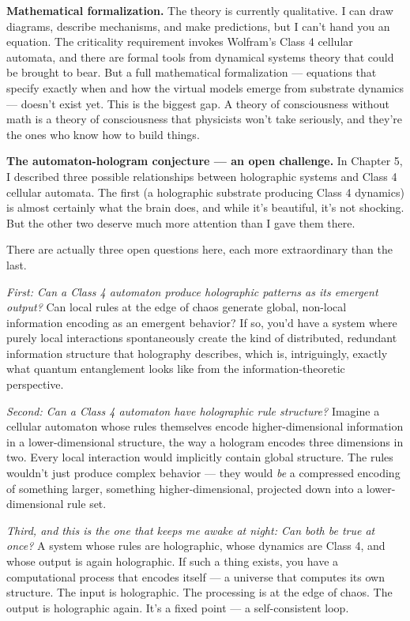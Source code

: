 \documentclass[11pt, twoside, openright]{book}
\begin{document}
\textbf{Mathematical formalization.} The theory is currently qualitative. I can draw diagrams, describe mechanisms, and make predictions, but I can't hand you an equation. The criticality requirement invokes Wolfram's Class 4 cellular automata, and there are formal tools from dynamical systems theory that could be brought to bear. But a full mathematical formalization --- equations that specify exactly when and how the virtual models emerge from substrate dynamics --- doesn't exist yet. This is the biggest gap. A theory of consciousness without math is a theory of consciousness that physicists won't take seriously, and they're the ones who know how to build things.

\textbf{The automaton-hologram conjecture --- an open challenge.} In Chapter 5, I described three possible relationships between holographic systems and Class 4 cellular automata. The first (a holographic substrate producing Class 4 dynamics) is almost certainly what the brain does, and while it's beautiful, it's not shocking. But the other two deserve much more attention than I gave them there.

There are actually three open questions here, each more extraordinary than the last.

\textit{First: Can a Class 4 automaton produce holographic patterns as its emergent output?} Can local rules at the edge of chaos generate global, non-local information encoding as an emergent behavior? If so, you'd have a system where purely local interactions spontaneously create the kind of distributed, redundant information structure that holography describes, which is, intriguingly, exactly what quantum entanglement looks like from the information-theoretic perspective.

\textit{Second: Can a Class 4 automaton have holographic rule structure?} Imagine a cellular automaton whose rules themselves encode higher-dimensional information in a lower-dimensional structure, the way a hologram encodes three dimensions in two. Every local interaction would implicitly contain global structure. The rules wouldn't just produce complex behavior --- they would \textit{be} a compressed encoding of something larger, something higher-dimensional, projected down into a lower-dimensional rule set.

\textit{Third, and this is the one that keeps me awake at night: Can both be true at once?} A system whose rules are holographic, whose dynamics are Class 4, and whose output is again holographic. If such a thing exists, you have a computational process that encodes itself --- a universe that computes its own structure. The input is holographic. The processing is at the edge of chaos. The output is holographic again. It's a fixed point --- a self-consistent loop.
\end{document}
